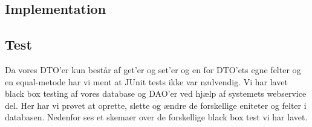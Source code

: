 \documentclass[a4paper]{article}
\begin{document}

\subsection{Implementation} %


\subsection{Test} %

Da vores DTO’er kun består af get’er og set’er og en for DTO’ets egne felter og en equal-metode har vi ment at JUnit tests ikke var nødvendig. Vi har lavet black box testing af vores database og DAO’er ved hjælp af systemets webservice del. Her har vi prøvet at oprette, slette og ændre de forskellige eniteter og felter i databasen. Nedenfor ses et skemaer over de forskellige black box test vi har lavet.


\end{document}

